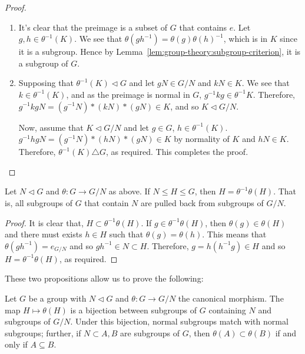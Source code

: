 \documentclass[12pt]{report}
\begin{document}
\begin{proof}
  \begin{enumerate}
  \item
    It's clear that the preimage is a subset of \(G\) that contains \(e\).
    Let \(g, h \in \theta^{-1}(K)\).
    We see that \(\theta(gh^{-1}) = \theta(g)\theta(h)^{-1}\), which is in \(K\) since it is a subgroup.
    Hence by Lemma~\ref{lem:group-theory:subgroup-criterion}, it is a subgroup of \(G\).

    \item
      Supposing that \(\theta^{-1}(K) \triangleleft G\) and let \(gN \in G/N\) and \(kN \in K\).
      We see that \(k \in \theta^{-1}(K)\), and as the preimage is normal in \(G\), \(g^{-1}kg \in \theta^{-1}K\).
      Therefore, \(g^{-1}kgN = (g^{-1}N)*(kN)*(gN) \in K\), and so \(K \triangleleft G/N\).

      Now, assume that \(K \triangleleft G/N\) and let \(g \in G\), \(h \in \theta^{-1}(K)\).
      \(g^{-1}hgN = (g^{-1}N)*(hN)*(gN) \in K\) by normality of \(K\) and \(hN \in K\).
      Therefore, \(\theta^{-1}(K) \triangle G\), as required.
      This completes the proof.

  \end{enumerate}
\end{proof}

\begin{proposition}\label{prp:group-theory:normal-subgroups-pullback}
  Let \(N \triangleleft G\) and \(\theta : G \to G/N\) as above. If \(N \leq H \leq G\), then \(H = \theta^{-1}\theta(H)\).
  That is, all subgroups of \(G\) that contain \(N\) are pulled back from subgroups of \(G/N\).
\end{proposition}

\begin{proof}
  It is clear that, \(H \subset \theta^{-1}\theta (H)\).
  If \(g \in \theta^{-1}\theta(H)\), then \(\theta(g) \in \theta(H)\) and there must exists \(h \in H\) such that \(\theta(g) = \theta(h)\).
  This means that \(\theta(g h^{-1}) = e_{G/N}\) and so \(g h^{-1} \in N \subset H\).
  Therefore, \(g = h(h^{-1}g) \in H\) and so \(H = \theta^{-1}\theta(H)\), as required.
\end{proof}



These two propositions allow us to prove the following:

\begin{theorem}
  \label{thm:group-theory:the-correspondence-theorem}
  Let \(G\) be a group with \(N \triangleleft G\) and \(\theta: G \to G/N\) the canonical morphism.
  The map \(H \mapsto \theta(H)\) is a bijection between subgroups of \(G\) containing \(N\) and subgroups of \(G/N\).
  Under this bijection, normal subgroups match with normal subgroups; further, if \(N \subset A,B\) are subgroups of \(G\), then \(\theta(A) \subset \theta(B)\) if and only if \(A \subseteq B\).
\end{theorem}
\end{document}
